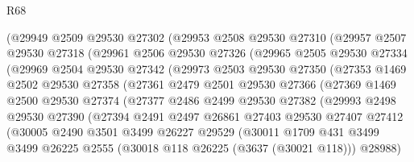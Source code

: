 \begin{lexlean}{R68}
\begin{coremodule}
          (@29949
            @2509
            @29530
            @27302
            (@29953
              @2508
              @29530
              @27310
              (@29957
                @2507
                @29530
                @27318
                (@29961
                  @2506
                  @29530
                  @27326
                  (@29965
                    @2505
                    @29530
                    @27334
                    (@29969
                      @2504
                      @29530
                      @27342
                      (@29973
                        @2503
                        @29530
                        @27350
                        (@27353
                          @1469
                          @2502
                          @29530
                          @27358
                          (@27361
                            @2479
                            @2501
                            @29530
                            @27366
                            (@27369
                              @1469
                              @2500
                              @29530
                              @27374
                              (@27377
                                @2486
                                @2499
                                @29530
                                @27382
                                (@29993
                                  @2498
                                  @29530
                                  @27390
                                  (@27394
                                    @2491
                                    @2497
                                    @26861
                                    @27403
                                    @29530
                                    @27407
                                    @27412
                                    (@30005
                                      @2490
                                      @3501
                                      @3499
                                      @26227
                                      @29529
                                      (@30011
                                        @1709
                                        @431
                                        @3499
                                        @3499
                                        @26225
                                        @2555
                                        (@30018 @118 @26225 (@3637 (@30021 @118)))
                                        @28988)

\end{coremodule}
\end{lexlean}
